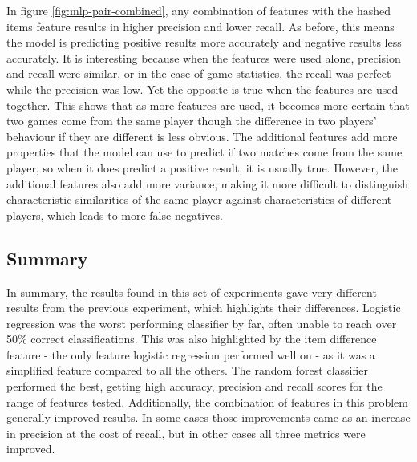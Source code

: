 \documentclass[Report.tex]{subfiles}
\begin{document}
In figure \ref{fig:mlp-pair-combined}, any combination of features with the hashed items feature results in higher precision and lower recall. As before, this means the model is predicting positive results more accurately and negative results less accurately. It is interesting because when the features were used alone, precision and recall were similar, or in the case of game statistics, the recall was perfect while the precision was low. Yet the opposite is true when the features are used together. This shows that as more features are used, it becomes more certain that two games come from the same player though the difference in two players' behaviour if they are different is less obvious. The additional features add more properties that the model can use to predict if two matches come from the same player, so when it does predict a positive result, it is usually true. However, the additional features also add more variance, making it more difficult to distinguish characteristic similarities of the same player against characteristics of different players, which leads to more false negatives. 




\subsection{Summary}
In summary, the results found in this set of experiments gave very different results from the previous experiment, which highlights their differences. Logistic regression was the worst performing classifier by far, often unable to reach over 50\% correct classifications. This was also highlighted by the item difference feature - the only feature logistic regression performed well on - as it was a simplified feature compared to all the others. The random forest classifier performed the best, getting high accuracy, precision and recall scores for the range of features tested. Additionally, the combination of features in this problem generally improved results. In some cases those improvements came as an increase in precision at the cost of recall, but in other cases all three metrics were improved. 


\end{document}
